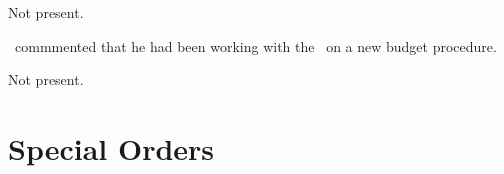 \begin{information}

    Not present.

    \seneca\ commmented that he had been working with the \vpof\ on a new
    budget procedure.

\end{information}

\begin{information}

    Not present.

\end{information}

\section*{Special Orders}
